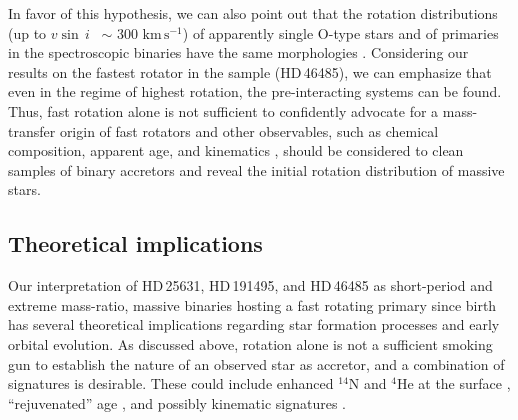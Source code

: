 \documentclass{aa}
\newcommand{\kms}{$\mathrm{km\,s^{-1}}$}
\newcommand{\vsini} {$v\sin\,i$}
\begin{document}
In favor of this hypothesis, we can also point out that the rotation distributions
(up to \vsini~ $\sim$ 300 \kms) of apparently single O-type stars
and of primaries in the spectroscopic binaries have the same morphologies
\citep{vfts_2015_otype}. Considering our results on
the fastest rotator in the sample (HD\,46485), we can emphasize that
even in the regime of highest rotation, the pre-interacting systems can be found. Thus, fast rotation alone is not sufficient
  to confidently advocate for a mass-transfer origin of fast rotators and other observables, such as
chemical composition, apparent age, and kinematics \citep{blaauw:61, blaauw:93, Renzo_2019runaways, Renzo_2021}, should be
considered to clean samples of binary accretors and reveal the initial rotation distribution of massive stars.


\subsection{Theoretical implications}

Our interpretation of HD\,25631, HD\,191495, and HD\,46485 as
  short-period and extreme mass-ratio, massive binaries hosting a
  fast rotating primary since birth has several theoretical
  implications regarding star formation processes and early orbital
  evolution. As discussed above, rotation alone is not a
  sufficient smoking gun to establish the nature of an observed star
  as accretor, and a combination of signatures is desirable. These
  could include enhanced $^{14}\mathrm{N}$ and $^4\mathrm{He}$ at the
  surface \citep[e.g.,][]{blaauw:93, Renzo_2021}, ``rejuvenated'' age
  \citep[e.g.,][]{neo:77, schneider:16, renzo:23}, and possibly
  kinematic signatures \citep[e.g.,][]{Renzo_2019runaways}.
\end{document}

